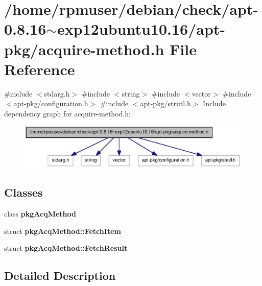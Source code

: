 \section{/home/rpmuser/debian/check/apt-\/0.8.16$\sim$exp12ubuntu10.16/apt-\/pkg/acquire-\/method.h \-File \-Reference}
\label{acquire-method_8h}
{\ttfamily \#include $<$stdarg.\-h$>$}\*
{\ttfamily \#include $<$string$>$}\*
{\ttfamily \#include $<$vector$>$}\*
{\ttfamily \#include $<$apt-\/pkg/configuration.\-h$>$}\*
{\ttfamily \#include $<$apt-\/pkg/strutl.\-h$>$}\*
\-Include dependency graph for acquire-\/method.h\-:
\nopagebreak
\begin{figure}[H]
\begin{center}
\leavevmode
\includegraphics[width=350pt]{acquire-method_8h__incl}
\end{center}
\end{figure}
\subsection*{\-Classes}
\begin{DoxyCompactItemize}
\item 
class {\bf pkg\-Acq\-Method}
\item 
struct {\bf pkg\-Acq\-Method\-::\-Fetch\-Item}
\item 
struct {\bf pkg\-Acq\-Method\-::\-Fetch\-Result}
\end{DoxyCompactItemize}


\subsection{\-Detailed \-Description}
